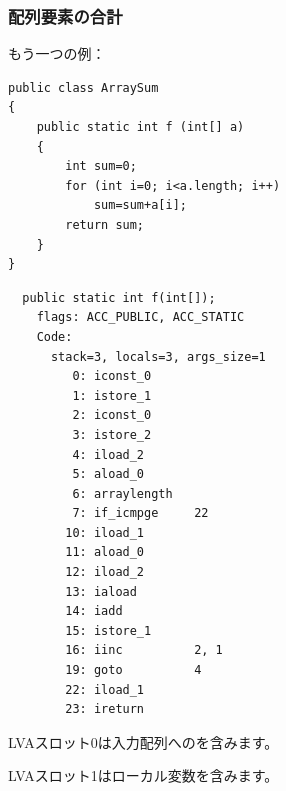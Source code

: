 \subsubsection{配列要素の合計}

もう一つの例：

\begin{lstlisting}[style=customjava]
public class ArraySum
{
	public static int f (int[] a)
	{
		int sum=0;
		for (int i=0; i<a.length; i++)
			sum=sum+a[i];
		return sum;
	}
}
\end{lstlisting}

\begin{lstlisting}
  public static int f(int[]);
    flags: ACC_PUBLIC, ACC_STATIC
    Code:
      stack=3, locals=3, args_size=1
         0: iconst_0      
         1: istore_1      
         2: iconst_0      
         3: istore_2      
         4: iload_2       
         5: aload_0       
         6: arraylength   
         7: if_icmpge     22
        10: iload_1       
        11: aload_0       
        12: iload_2       
        13: iaload        
        14: iadd          
        15: istore_1      
        16: iinc          2, 1
        19: goto          4
        22: iload_1       
        23: ireturn       
\end{lstlisting}

\ac{LVA}スロット0は入力配列へのを含みます。

\ac{LVA}スロット1はローカル変数を含みます。